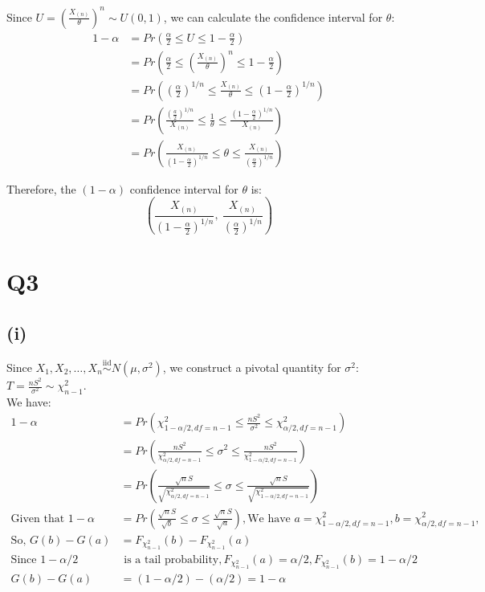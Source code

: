 \documentclass{article}
\begin{document}
Since $U = (\frac{X_{(n)}}{\theta})^n \sim U(0, 1)$, we can calculate the confidence interval for $\theta$:
\begin{align*}
1 - \alpha &= Pr\left(\frac{\alpha}{2} \leq U \leq 1 - \frac{\alpha}{2}\right) \\
&= Pr\left(\frac{\alpha}{2} \leq (\frac{X_{(n)}}{\theta})^n \leq 1 - \frac{\alpha}{2}\right) \\
&= Pr\left((\frac{\alpha}{2})^{1/n} \leq \frac{X_{(n)}}{\theta} \leq (1 - \frac{\alpha}{2})^{1/n}\right) \\
&= Pr\left(\frac{(\frac{a}{2})^{1/n}}{X_{(n)}} \leq \frac{1}{\theta} \leq \frac{(1 - \frac{\alpha}{2})^{1/n}}{X_{(n)}}\right) \\
&= Pr\left(\frac{X_{(n)}}{(1 - \frac{\alpha}{2})^{1/n}} \leq \theta \leq \frac{X_{(n)}}{(\frac{\alpha}{2})^{1/n}}\right)
\end{align*}

Therefore, the \( (1 - \alpha) \) confidence interval for \( \theta \) is:
\[
\left(\frac{X_{(n)}}{(1 - \frac{\alpha}{2})^{1/n}}, \ \frac{X_{(n)}}{(\frac{\alpha}{2})^{1/n}}\right)
\]

\section*{Q3}

\subsection*{(i)}

Since $X_1, X_2, \ldots, X_n \overset{\text{iid}}{\sim} N(\mu, \sigma^2)$, we construct a pivotal quantity for $\sigma^2$: $T = \frac{nS^2}{\sigma^2} \sim \chi^2_{n-1}$. \\
We have:
\begin{align*}
1-\alpha &= Pr\left(\chi^2_{1-\alpha/2, df=n-1} \leq \frac{nS^2}{\sigma^2} \leq \chi^2_{\alpha/2, df=n-1}\right) \\
&= Pr\left(\frac{nS^2}{\chi^2_{\alpha/2, df=n-1}} \leq \sigma^2 \leq \frac{nS^2}{\chi^2_{1-\alpha/2, df=n-1}}\right) \\
&= Pr\left(\frac{\sqrt{n}S}{\sqrt{\chi^2_{\alpha/2, df=n-1}}} \leq \sigma \leq \frac{\sqrt{n}S}{\sqrt{\chi^2_{1-\alpha/2, df=n-1}}}\right) \\
\text{Given that } 1-\alpha &= Pr(\frac{\sqrt{n}S}{\sqrt{b}} \leq \sigma \leq \frac{\sqrt{n}S}{\sqrt{a}}), \text{We have } a = \chi^2_{1-\alpha/2, df=n-1}, b = \chi^2_{\alpha/2, df=n-1}, \\
\text{So, } G(b) - G(a) &= F_{\chi^2_{n-1}}(b) - F_{\chi^2_{n-1}}(a) \\
\text{Since } 1 - \alpha/2 & \text{ is a tail probability}, F_{\chi^2_{n-1}}(a) = \alpha/2, F_{\chi^2_{n-1}}(b) = 1 - \alpha/2 \\
G(b) - G(a) &= (1 - \alpha/2) - (\alpha/2) = 1 - \alpha
\end{align*}
\end{document}
